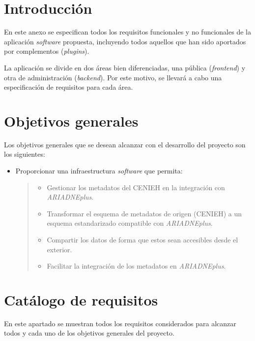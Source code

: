 
\section{Introducción}

En este anexo se especifican todos los requisitos funcionales y no
funcionales de la aplicación \emph{software} propuesta, incluyendo todos
aquellos que han sido aportados por complementos (\emph{plugins}).

La aplicación se divide en dos áreas bien diferenciadas, una pública
(\emph{frontend}) y otra de administración (\emph{backend}). Por este
motivo, se llevará a cabo una especificación de requisitos para cada
área.

\section{Objetivos generales}

Los objetivos generales que se desean alcanzar con el desarrollo del
proyecto son los siguientes:

\begin{itemize}
\item
  Proporcionar una infraestructura \emph{software} que permita:

  \begin{quote}
  \begin{itemize}
  \tightlist
  \item
    Gestionar los metadatos del CENIEH en la integración con
    \emph{ARIADNEplus}.
  \item
    Transformar el esquema de metadatos de origen (CENIEH) a un
    esquema estandarizado compatible con \emph{ARIADNEplus}.
  \item
    Compartir los datos de forma que estos sean accesibles desde el
    exterior.
  \item
    Facilitar la integración de los metadatos en \emph{ARIADNEplus}.
  \end{itemize}
  \end{quote}
\end{itemize}

\section{Catálogo de requisitos}

En este apartado se muestran todos los requisitos considerados para
alcanzar todos y cada uno de los objetivos generales del proyecto.

